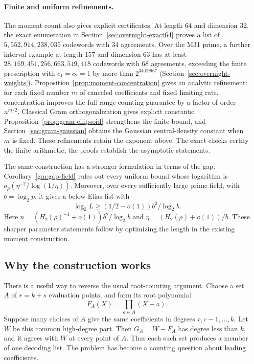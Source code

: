 \documentclass[11pt,letterpaper]{article}
\theoremstyle{definition}
\theoremstyle{remark}
\begin{document}
\paragraph{Finite and uniform refinements.}
The moment count also gives explicit certificates. At length $64$ and
dimension $32$, the exact enumeration in
Section~\ref{sec:overnight-exact64} proves a list of
$5{,}552{,}914{,}238{,}035$ codewords with $34$ agreements.
Over the M31 prime, a further interval example at length $157$ and
dimension $63$ has at least $28{,}169{,}451{,}256{,}663{,}519{,}418$
codewords with $68$ agreements, exceeding the finite prescription with
$c_1=c_2=1$ by more than $2^{34.09967}$
(Section~\ref{sec:overnight-weights}). Proposition~\ref{prop:moment-concentration} gives
an analytic refinement: for each fixed number $m$ of canceled
coefficients and fixed limiting rate, concentration improves the
full-range counting guarantee by a factor of order $n^{m/2}$.
Classical Gram orthogonalization gives explicit constants;
Proposition~\ref{prop:gram-ellipsoid} strengthens the finite bound,
and Section~\ref{sec:gram-gaussian} obtains the Gaussian central-density
constant when $m$ is fixed. These refinements retain the exponent above.
The exact checks certify the finite arithmetic; the proofs establish
the asymptotic statements.

The same construction has a stronger formulation in terms of the gap.
Corollary~\ref{gm:gap-field} rules out every uniform bound whose logarithm
is $o_\rho(\eta^{-2}/\log(1/\eta))$. Moreover, over every sufficiently
large prime field, with $b=\log_2p$, it gives a below-Elias list with
\[
 \log_2 L\ge(1/2-o(1))b^2/\log_2b.
\]
Here $n=(H_2(\rho)^{-1}+o(1))b^2/\log_2b$ and
$\eta=(H_2(\rho)+o(1))/b$. These sharper parameter statements follow
by optimizing the length in the existing moment construction.

\subsection{Why the construction works}

There is a useful way to reverse the usual root-counting argument.
Choose a set $A$ of $r=k+s$ evaluation points, and form its root
polynomial
\[
 F_A(X)=\prod_{a\in A}(X-a).
\]
Suppose many choices of $A$ give the same coefficients in degrees
$r,r-1,\ldots,k$. Let $W$ be this common high-degree part. Then
$G_A=W-F_A$ has degree less than $k$, and it agrees with $W$ at every
point of $A$. Thus each such set produces a member of one decoding
list. The problem has become a counting question about leading
coefficients.
\end{document}
